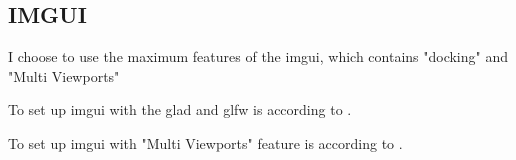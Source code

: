 \documentclass{article}
\theoremstyle{definition} %
\newtheorem{definition}{Definition}[section]
\begin{document}
\subsection[IMGUI]{IMGUI}
I choose to use the maximum features of the
imgui, which contains "docking" and
"Multi Viewports"

To set up imgui with the glad and glfw is
according to
\cite[setupImgui]{example-if-you-are-using-glfw--openglwebgl}.

To set up imgui with "Multi Viewports" feature
is according to
\cite[text]{Multi-Viewports}.




\end{document}
